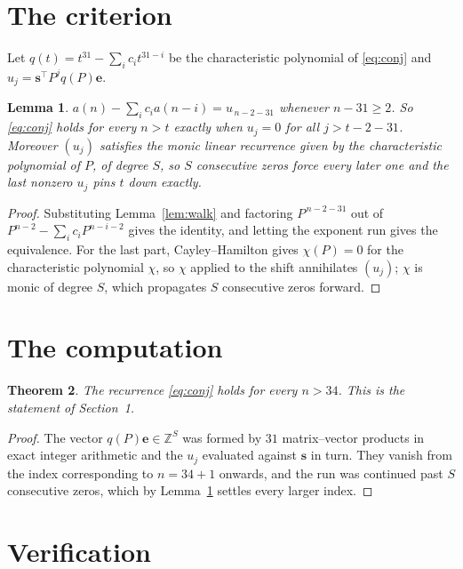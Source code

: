 \documentclass[11pt,a4paper]{article}
\theoremstyle{plain}
\newtheorem{theorem}{Theorem}
\newtheorem{lemma}[theorem]{Lemma}
\theoremstyle{definition}
\begin{document}
\section{The criterion}

Let $q(t)=t^{31}-\sum_i c_i t^{31-i}$ be the characteristic polynomial of
\eqref{eq:conj} and $u_j=\mathbf{s}^{\!\top}P^{j}q(P)\mathbf{e}$.

\begin{lemma}\label{lem:crit}
$a(n)-\sum_i c_i a(n-i)=u_{\,n-2-31}$ whenever $n-31\ge2$. So \eqref{eq:conj}
holds for every $n>t$ exactly when $u_j=0$ for all $j>t-2-31$. Moreover $(u_j)$
satisfies the monic linear recurrence given by the characteristic polynomial of $P$, of
degree $S$, so $S$ consecutive zeros force every later one and the last nonzero $u_j$ pins
$t$ down exactly.
\end{lemma}

\begin{proof}
Substituting Lemma~\ref{lem:walk} and factoring $P^{\,n-2-31}$ out of
$P^{n-2}-\sum_i c_i P^{n-i-2}$ gives the identity, and letting the exponent run gives the
equivalence. For the last part, Cayley--Hamilton gives $\chi(P)=0$ for the characteristic
polynomial $\chi$, so $\chi$ applied to the shift annihilates $(u_j)$; $\chi$ is monic of
degree $S$, which propagates $S$ consecutive zeros forward.
\end{proof}

\section{The computation}

\begin{theorem}
The recurrence \eqref{eq:conj} holds for every $n>34$. This is the statement of
Section~1.
\end{theorem}

\begin{proof}
The vector $q(P)\mathbf{e}\in\mathbb{Z}^{S}$ was formed by $31$ matrix--vector
products in exact integer arithmetic and the $u_j$ evaluated against $\mathbf{s}$ in turn.
They vanish from the index corresponding to $n=34+1$ onwards, and the run was continued
past $S$ consecutive zeros, which by Lemma~\ref{lem:crit} settles every larger index.
\end{proof}

\section{Verification}
\end{document}
